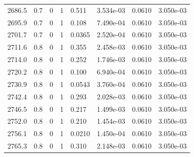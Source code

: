 \documentclass[preview]{standalone}
\begin{document}
{{{{{{{{{{{\begin{tabular}{L{1.2cm}C{1.2cm} C{0.3cm}C{0.5cm} C{1.4cm}C{1.4cm} C{1.4cm}C{1.4cm}}
  2686.5  &   0.7  & 0     &  1 &  0.511  & 3.534e-03  & 0.0610 &  3.050e-03   \\ 
  2695.9  &   0.7  & 0     &  1 &  0.108  & 7.490e-04  & 0.0610 &  3.050e-03   \\ 
  2701.7  &   0.7  & 0     &  1 &  0.0365  & 2.520e-04  & 0.0610 &  3.050e-03   \\ 
  2711.6  &   0.8  & 0     &  1 &  0.355  & 2.458e-03  & 0.0610 &  3.050e-03   \\ 
  2714.0  &   0.8  & 0     &  1 &  0.252  & 1.746e-03  & 0.0610 &  3.050e-03   \\ 
  2720.2  &   0.8  & 0     &  1 &  0.100  & 6.940e-04  & 0.0610 &  3.050e-03   \\ 
  2730.9  &   0.8  & 0     &  1 &  0.0543  & 3.760e-04  & 0.0610 &  3.050e-03   \\ 
  2742.4  &   0.8  & 0     &  1 &  0.293  & 2.028e-03  & 0.0610 &  3.050e-03   \\ 
  2746.5  &   0.8  & 0     &  1 &  0.217  & 1.499e-03  & 0.0610 &  3.050e-03   \\ 
  2752.0  &   0.8  & 0     &  1 &  0.210  & 1.454e-03  & 0.0610 &  3.050e-03   \\ 
  2756.1  &   0.8  & 0     &  1 &  0.0210  & 1.450e-04  & 0.0610 &  3.050e-03   \\ 
  2765.3  &   0.8  & 0     &  1 &  0.310  & 2.148e-03  & 0.0610 &  3.050e-03   \\ 
\hline 
\end{tabular} 

}}}}}}}}}}}
\end{document}
